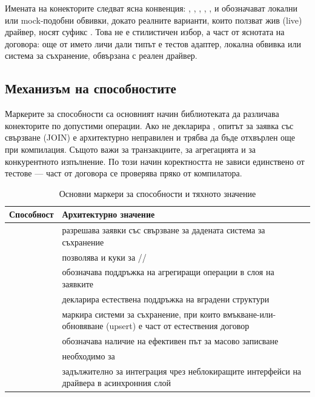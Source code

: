 Имената на конекторите следват ясна конвенция: , , , , ,  и  обозначават локални или mock-подобни обвивки, докато реалните варианти, които ползват жив (live) драйвер, носят суфикс . Това не е стилистичен избор, а част от яснотата на договора: още от името личи дали типът е тестов адаптер, локална обвивка или система за съхранение, обвързана с реален драйвер.

\subsection{Механизъм на способностите}
\label{subsec:capabilities}

Маркерите за способности са основният начин библиотеката да различава конекторите по допустими операции. Ако  не декларира , опитът за заявка със свързване (JOIN) е архитектурно неправилен и трябва да бъде отхвърлен още при компилация. Същото важи за транзакциите, за агрегацията и за конкурентното изпълнение. По този начин коректността не зависи единствено от тестове --- част от договора се проверява пряко от компилатора.

\begin{table}[H]
\centering
\small
\caption{Основни маркери за способности и тяхното значение}
\label{tab:capability_tags}
\begin{tabularx}{\textwidth}{L{5.5cm}Y}
\toprule
\textbf{Способност} & \textbf{Архитектурно значение} \\
\midrule
{} & разрешава заявки със свързване за дадената система за съхранение \\
\hdashline
{} & позволява  и куки за // \\
\hdashline
{} & обозначава поддръжка на агрегиращи операции в слоя на заявките \\
\hdashline
{} & декларира естествена поддръжка на вградени структури \\
\hdashline
{} & маркира системи за съхранение, при които вмъкване-или-обновяване (upsert) е част от естествения договор \\
\hdashline
{} & обозначава наличие на ефективен път за масово записване \\
\hdashline
{} & необходимо за  \\
\hdashline
{} & задължително за интеграция чрез неблокиращите интерфейси на драйвера в асинхронния слой \\
\bottomrule
\end{tabularx}
\end{table}

